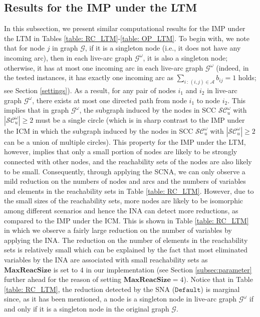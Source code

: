 \documentclass[a4paper,10pt]{article}
\newcommand{\maxlength}{\mathbf{MaxReacSize}}
\newcommand{\A}{\mathcal{A}}
\theoremstyle{plain}
\newcommand{\revv}[1]{{#1}}
\newcommand{\Default}{{\texttt{Default}}\xspace}
\begin{document}
\subsection{Results for the IMP under the LTM}\label{sect: ELTM}

In this subsection, we present similar computational results for the IMP under the LTM in Tables \ref{table: RC_LTM}-\ref{table: OP_LTM}.
%
To begin with, we note that for node $j$ in graph $\mathcal{G}$, if it is a singleton node (i.e., it does not have any incoming arc),
then in each live-arc graph $\mathcal{G}^{\omega}$, it is also a singleton node;
otherwise, it has at most one incoming arc in each live-arc graph $\mathcal{G}^{\omega}$ (indeed, in the tested instances, it has exactly one incoming arc as $\sum_{i\,:\,(i,j)\in\A}b_{ij}=1$ holds; see \revv{Section} \ref{settings}).
As a result, for any pair of nodes $i_1$ and $i_2 $ in  live-arc graph $\mathcal{G}^{\omega}$,  there exists at most one directed path from node $i_1$ to node $i_2$.
This implies that in graph $\mathcal{G}^\omega$, the subgraph induced by the nodes in SCC $\mathcal{SC}_u^\omega$ with $|\mathcal{SC}_u^\omega| \geq 2$ must be a single circle
(which is in sharp contrast to the IMP under the ICM in which the subgraph induced by the nodes in SCC $\mathcal{SC}_u^\omega$ with $|\mathcal{SC}_u^\omega| \geq 2$ can be a union of multiple circles).
%
\revv{This property for the IMP under the LTM, however, implies that only a small portion of nodes are likely to be strongly connected with other nodes, and the reachability sets of the nodes are also likely to be small.}
%
Consequently, through applying the SCNA, we can only observe a mild reduction on the numbers of nodes and arcs and the numbers of variables and  \revv{elements in the reachability sets} in Table \ref{table: RC_LTM}.
However, due to the small sizes of the reachability sets, more nodes are likely to be isomorphic among different scenarios and hence the INA can detect more reductions, as compared to the IMP under the ICM.
%
This is shown in Table \ref{table: RC_LTM} in which we observe a fairly large reduction on the number of variables by applying the INA.
The reduction on the number of \revv{elements in the reachability sets} is relatively small which can be explained by the fact that most eliminated variables by the INA are associated with small reachability sets as $\maxlength$ is set to $4$ in our implementation (see \revv{Section} \ref{subsec:parameter} further ahead for the reason of setting $\maxlength=4$).
Notice that in Table \ref{table: RC_LTM}, the reduction detected by the SNA ($\Default$) is marginal since, as it has been mentioned, a node is a singleton node in live-arc graph $\mathcal{G}^{\omega}$ if and only if it is a singleton node in the original graph $\mathcal{G}$.
\end{document}
